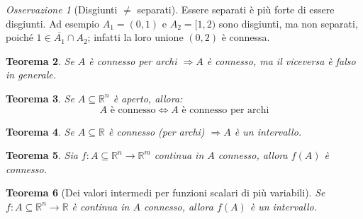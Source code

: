 \documentclass[11pt, a4paper, openright]{book}
\theoremstyle{plain}
\newtheorem{teorema}{Teorema}[section]
\theoremstyle{definition}
\theoremstyle{remark}
\newtheorem{osservazione}[teorema]{Osservazione}
\begin{document}
\begin{osservazione}[Disgiunti $\neq$ separati]
    Essere separati è più forte di essere disgiunti. Ad esempio $A_1 = (0, 1)$ e $A_2 = [1, 2)$ sono disgiunti, ma non separati, poiché $1 \in \bar{A_1} \cap A_2$; infatti la loro unione $(0, 2)$ è connessa.
\end{osservazione}

\begin{teorema}
    Se $A$ è connesso per archi $\Longrightarrow A$ è connesso, ma il viceversa è falso in generale.
\end{teorema}

\begin{teorema}
    Se $A \subseteq \mathbb{R}^n$ è aperto, allora:
    \begin{equation}
        A \text{ è connesso} \iff A \text{ è connesso per archi}
    \end{equation}
\end{teorema}

\begin{teorema}
    Se $A \subseteq \mathbb{R}$ è connesso (per archi) $\Longrightarrow A$ è un intervallo.
\end{teorema}

\begin{teorema}
    Sia $f: A \subseteq \mathbb{R}^n \longrightarrow \mathbb{R}^m$ continua in $A$ connesso, allora $f(A)$ è connesso.
\end{teorema}

\begin{teorema}[Dei valori intermedi per funzioni scalari di più variabili]
    Se $f: A \subseteq \mathbb{R}^n \longrightarrow \mathbb{R}$ è continua in $A$ connesso, allora $f(A)$ è un intervallo.
\end{teorema}
\end{document}
